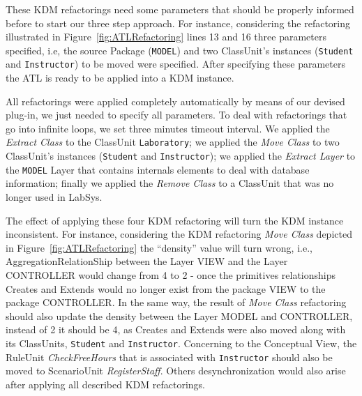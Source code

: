 These KDM refactorings need some parameters that should be properly informed before to start our three step approach. For instance, considering the refactoring illustrated in Figure~\ref{fig:ATLRefactoring} lines 13 and 16 three parameters specified, i.e, the source Package (\texttt{MODEL}) and two ClassUnit's instances (\texttt{Student} and \texttt{Instructor}) to be moved were specified. %
After specifying these parameters the ATL is ready to be applied into a KDM instance.


All refactorings were applied completely automatically by means of our devised plug-in, we just needed to specify all parameters. To deal with refactorings that go into infinite loops, we set three minutes timeout interval. 
We applied the \textit{Extract Class} to the ClassUnit \texttt{Laboratory}; we applied the \textit{Move Class} to two ClassUnit's instances (\texttt{Student} and \texttt{Instructor}); we applied the \textit{Extract Layer} to the \texttt{MODEL} Layer that contains internals elements to deal with database information; finally we applied the \textit{Remove Class} to a ClassUnit that was no longer used in LabSys.

The effect of applying these four KDM refactoring will turn the KDM instance inconsistent. For instance, considering the KDM refactoring \textit{Move Class} depicted in Figure~\ref{fig:ATLRefactoring} the ``density'' value will turn wrong, i.e., AggregationRelationShip between
the Layer VIEW and the Layer CONTROLLER would
change from 4 to 2 - once the primitives relationships Creates
and Extends would no longer exist from the package VIEW
to the package CONTROLLER. In the same way, the result of \textit{Move Class} refactoring should also update the density between the Layer
MODEL and CONTROLLER, instead of 2 it should be 4, as
Creates and Extends were also moved along with its
ClassUnits, \texttt{Student} and \texttt{Instructor}. Concerning to the
Conceptual View, the RuleUnit \textit{CheckFreeHours} that is associated with
\texttt{Instructor} should also be moved to ScenarioUnit \textit{RegisterStaff}. Others desynchronization would also arise after applying all described KDM refactorings. 

